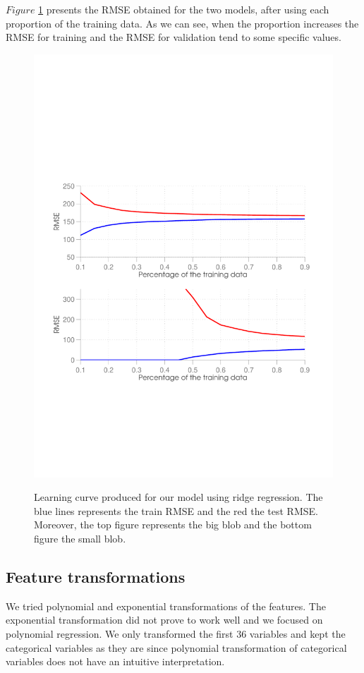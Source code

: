 $Figure$ \ref{fig:learning_curve} presents the RMSE obtained for the two models, after using each proportion of the training data. As we can see, when the proportion increases the RMSE for training and the RMSE for validation tend to some specific values.

\begin{figure}[ht]
  \centering
   \includegraphics[scale=0.45]{figures/learning_curve.pdf}
    \label{fig:learning_curve}
  \caption{Learning curve produced for our model using ridge regression. The blue lines represents the train RMSE and the red the test RMSE. Moreover, the top figure represents the big blob and the bottom figure the small blob.}
\end{figure}

\subsection{Feature transformations}
We tried polynomial and exponential transformations of the features.
The exponential transformation did not prove to work well and we focused on polynomial regression.
We only transformed the first 36 variables and kept the categorical variables as they are since polynomial transformation of categorical variables does not have an intuitive interpretation. 

